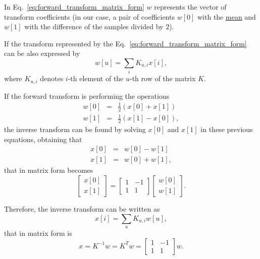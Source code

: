 In Eq.~\ref{eq:forward_transform_matrix_form} $w$ represents the
vector of transform coefficients (in our case, a pair of coefficients
$w[0]$ with the
\href{https://en.wikipedia.org/wiki/Arithmetic_mean}{mean} and $w[1]$
with the difference of the samples divided by $2$).

If the transform represented by the Eq.~\ref{eq:forward_transform_matrix_form} can be
also expressed by
\begin{equation}
  w[u] = \sum_i K_{u,i}x[i],
  \label{eq:forward_transform_linear_combination_form}
\end{equation}
where $K_{u,i}$ denotes $i$-th element of the $u$-th row of the matrix
$K$.

If the forward transform is performing the operations
\begin{equation*}
  \begin{array}{rcl}
  w[0] & = & \frac{1}{2}(x[0] + x[1])\\
  w[1] & = & \frac{1}{2}(x[1] - x[0]),
  \end{array}
\end{equation*}
the inverse transform can be found by solving $x[0]$ and $x[1]$ in
these previous equations, obtaining that
\begin{equation*}
  \begin{array}{rcl}
  x[0] & = & w[0] - w[1]\\
  x[1] & = & w[0] + w[1],
  \end{array}
\end{equation*}
that in matrix form becomes
\begin{equation*}
  \begin{bmatrix}
    x[0] \\
    x[1]
  \end{bmatrix}
  = 
  \begin{bmatrix} 1 & -1 \\ 1 & 1 \end{bmatrix}
  \begin{bmatrix}
    w[0] \\
    w[1]
  \end{bmatrix}.
\end{equation*}

Therefore, the inverse transform can be written as
\begin{equation}
  x[i] = \sum_u K_{u,i}w[u],
  \label{eq:inverse_transform_linear_combination_form}
\end{equation}
that in matrix form is
\begin{equation}
  x = K^{-1}w = K^Tw = \begin{bmatrix} 1 & -1 \\ 1 & 1 \end{bmatrix}w.
  \label{eq:inverse_transform_matrix_form}
\end{equation}

